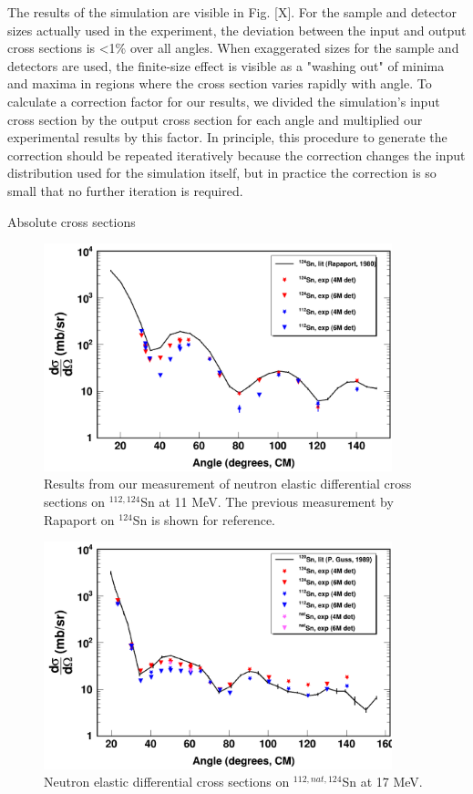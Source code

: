 The results of the simulation are visible in Fig. [X]. For the sample and
detector sizes actually used in the experiment, the deviation between the input
and output cross sections is <1\% over all angles. When exaggerated sizes for the
sample and detectors are used, the finite-size effect is visible as a "washing
out" of minima and maxima in regions where the cross section varies rapidly with
angle. To calculate a correction factor for our results, we divided the simulation's
input cross section by the output cross section for each angle and multiplied our
experimental results by this factor. In principle, this procedure to generate
the correction should be repeated iteratively because the correction changes the input distribution 
used for the simulation itself, but in practice the correction is so small
that no further iteration is required.

Absolute cross sections 

\begin{figure}
  \begin{center}
\includegraphics[width = 0.9\textwidth]{figures/neutronECS_Sn_11MeV.png}
\caption{Results from our measurement of neutron elastic differential cross sections on $^{112,124}$Sn at 11
MeV. The previous measurement by Rapaport on $^{124}$Sn \cite{Rapaport1980} is
shown for reference.} \label{SnECS_11MeV}
\end{center}
\end{figure}

\begin{figure}
  \begin{center}
\includegraphics[width = 0.9\textwidth]{figures/neutronECS_Sn_17MeV.png}
\caption{Neutron elastic differential cross sections on $^{112,nat,124}$Sn at 17
MeV.} \label{SnECS_17MeV}
\end{center}
\end{figure}

\afterpage{\clearpage}
